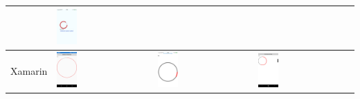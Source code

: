 \documentclass[english,master,public,dept460,male,cpdeclaration,oneside]{diploma}
\begin{document}
\begin{table}[!h]
\begin{tabular}{p{3cm} | p{4cm} | p{4cm} | p{4cm} }
		& \includegraphics[width=0.22\textwidth]{Figures/react4ios.jpg}
		&
		\\
		\midrule
		Xamarin	
		& \includegraphics[width=0.22\textwidth]{Figures/xamarin4android.PNG}
		& \includegraphics[width=0.22\textwidth]{Figures/xamarin4ios.jpg}
		& \includegraphics[width=0.22\textwidth]{Figures/xamarin4windows.PNG}
		\\
		\midrule
	\end{tabular}
\end{table}
\end{document}
